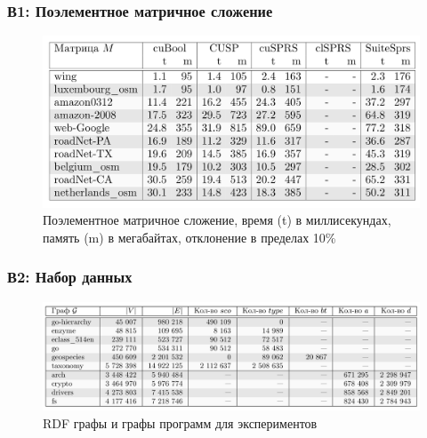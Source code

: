 \documentclass[aspectratio=169,xcolor=table,english]{beamer}
\begin{document}
\begin{frame}[fragile] \frametitle{В1: Поэлементное матричное сложение}
    \begin{center}
     \begin{minipage}[m]{0.85\linewidth}
        \begin{figure}
            \centering
            \includegraphics[width=1.0\textwidth]{figures/results_2_rq1.png}
            \caption{Поэлементное матричное сложение, время (t) в миллисекундах, память (m) в мегабайтах, отклонение в пределах 10\%}
        \end{figure}
    \end{minipage}\hfill   
    \end{center}
\end{frame}

\begin{frame}[fragile] \frametitle{В2: Набор данных}
    \begin{center}
     \begin{minipage}[m]{0.9\linewidth}
        \begin{figure}
            \centering
            \includegraphics[width=1.0\textwidth]{figures/dataset_rq2.png}
            \caption{RDF графы и графы программ для экспериментов}
        \end{figure}
    \end{minipage}\hfill   
    \end{center}
\end{frame}
\end{document}
